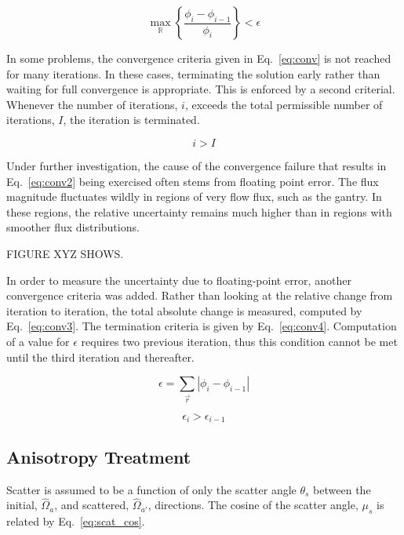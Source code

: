 \begin{equation}\label{eq:conv}
\max_{\mathbb{R}} \left\{ \frac{\phi_i - \phi_{i-1}}{\phi_i} \right\} < \epsilon
\end{equation}

In some problems, the convergence criteria given in Eq.~\ref{eq:conv} is not reached for many iterations. In these cases, terminating the solution early rather than waiting for full convergence is appropriate. This is enforced by a second criterial. Whenever the number of iterations, $i$, exceeds the total permissible number of iterations, $I$, the iteration is terminated.

\begin{equation}\label{eq:conv2}
i > I
\end{equation}

Under further investigation, the cause of the convergence failure that results in Eq.~\ref{eq:conv2} being exercised often stems from floating point error. The flux magnitude fluctuates wildly in regions of very flow flux, such as the gantry. In these regions, the relative uncertainty remains much higher than in regions with smoother flux distributions. 

FIGURE XYZ SHOWS.

In order to measure the uncertainty due to floating-point error, another convergence criteria was added. Rather than looking at the relative change from iteration to iteration, the total absolute change is measured, computed by Eq.~\ref{eq:conv3}. The termination criteria is given by Eq.~\ref{eq:conv4}. Computation of a value for $\epsilon$ requires two previous iteration, thus this condition cannot be met until the third iteration and thereafter.

\begin{equation}\label{eq:conv3}
\epsilon = \sum_{\vec{r}} |\phi_i - \phi_{i-1}|
\end{equation}

\begin{equation}\label{eq:conv4}
\epsilon_i > \epsilon_{i-1}
\end{equation}

\subsection{Anisotropy Treatment}

Scatter is assumed to be a function of only the scatter angle $\theta_s$ between the initial, $\hat{\Omega}_a$, and scattered, $\hat{\Omega}_{a'}$, directions. The cosine of the scatter angle, $\mu_s$ is related by Eq.~\ref{eq:scat_cos}.

